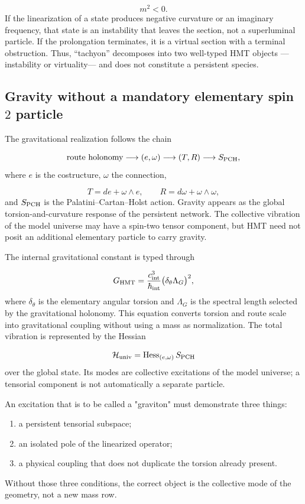 \[
 m^2<0.
\]
If the linearization of a state produces negative curvature or an imaginary frequency, that state is an instability that leaves the section, not a superluminal particle. If the prolongation terminates, it is a virtual section with a terminal obstruction. Thus, “tachyon” decomposes into two well-typed HMT objects ---instability or virtuality--- and does not constitute a persistent species.

\subsection{Gravity without a mandatory elementary spin \(2\) particle}
The gravitational realization follows the chain

\[
 \text{route holonomy}
 \longrightarrow(e,\omega)
 \longrightarrow(T,R)
 \longrightarrow
 S_{\rm PCH},
\]
where \(e\) is the costructure, \(\omega\) the connection,

\[
 T=de+\omega\wedge e,\qquad
 R=d\omega+\omega\wedge\omega,
\]
and \(S_{\rm PCH}\) is the Palatini--Cartan--Holst action. Gravity appears as the global torsion-and-curvature response of the persistent network. The collective vibration of the model universe may have a spin-two tensor component, but HMT need not posit an additional elementary particle to carry gravity.

The internal gravitational constant is typed through

\[
 G_{\rm HMT}
 =\frac{c_{\rm int}^3}{\hbar_{\rm int}}
 \bigl(\delta_\theta\Lambda_G\bigr)^2,
\]
where \(\delta_\theta\) is the elementary angular torsion and \(\Lambda_G\) is the spectral length selected by the gravitational holonomy. This equation converts torsion and route scale into gravitational coupling without using a mass as normalization. The total vibration is represented by the Hessian

\[
 \mathcal H_{\rm univ}
 =\operatorname{Hess}_{(e,\omega)}S_{\rm PCH}
\]
over the global state. Its modes are collective excitations of the model universe; a tensorial component is not automatically a separate particle.

An excitation that is to be called a "graviton" must demonstrate three things:

\begin{enumerate}
\item a persistent tensorial subspace;
\item an isolated pole of the linearized operator;
\item a physical coupling that does not duplicate the torsion already present.
\end{enumerate}
Without those three conditions, the correct object is the collective mode of the geometry, not a new mass row.

